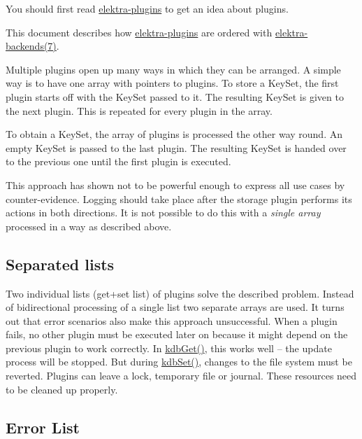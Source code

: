 You should first read \hyperlink{src_plugins_README_md}{elektra-\/plugins} to get an idea about plugins.

This document describes how \hyperlink{src_plugins_README_md}{elektra-\/plugins} are ordered with \hyperlink{doc_help_elektra-backends_md}{elektra-\/backends(7)}.

Multiple plugins open up many ways in which they can be arranged. A simple way is to have one array with pointers to plugins. To store a {\ttfamily Key\+Set}, the first plugin starts off with the {\ttfamily Key\+Set} passed to it. The resulting {\ttfamily Key\+Set} is given to the next plugin. This is repeated for every plugin in the array.

To obtain a {\ttfamily Key\+Set}, the array of plugins is processed the other way round. An empty {\ttfamily Key\+Set} is passed to the last plugin. The resulting {\ttfamily Key\+Set} is handed over to the previous one until the first plugin is executed.

This approach has shown not to be powerful enough to express all use cases by counter-\/evidence. Logging should take place after the storage plugin performs its actions in both directions. It is not possible to do this with a {\itshape single array} processed in a way as described above.

\subsection*{Separated lists}

Two individual lists (get+set list) of plugins solve the described problem. Instead of bidirectional processing of a single list two separate arrays are used. It turns out that error scenarios also make this approach unsuccessful. When a plugin fails, no other plugin must be executed later on because it might depend on the previous plugin to work correctly. In {\ttfamily \hyperlink{group__kdb_ga28e385fd9cb7ccfe0b2f1ed2f62453a1}{kdb\+Get()}}, this works well -- the update process will be stopped. But during {\ttfamily \hyperlink{group__kdb_ga11436b058408f83d303ca5e996832bcf}{kdb\+Set()}}, changes to the file system must be reverted. Plugins can leave a lock, temporary file or journal. These resources need to be cleaned up properly.

\subsection*{Error List}


